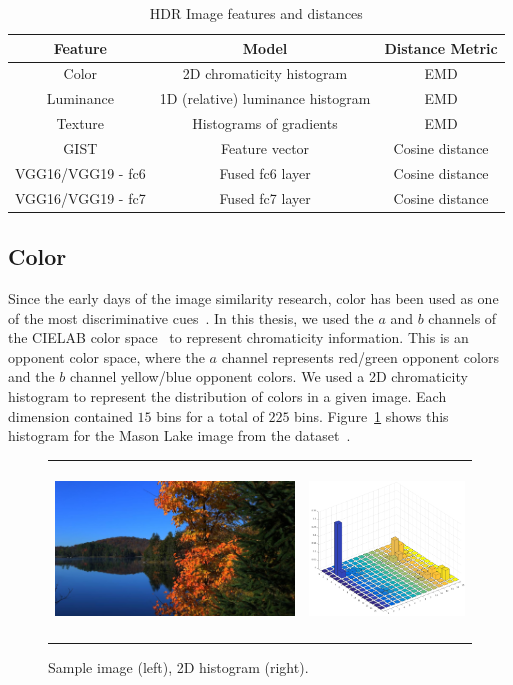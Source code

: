 \begin{table}
\caption{HDR Image features and distances}
\centering
\begin{tabular}{c|c|c}
\label{tab:table_feature}
\textbf{Feature} & \textbf{Model} & \textbf{Distance Metric}\\
\hline
Color  & 2D chromaticity histogram & EMD \\
Luminance  & 1D (relative) luminance histogram & EMD \\
Texture  & Histograms of gradients & EMD \\
GIST  & Feature vector & Cosine distance \\
VGG16/VGG19 - fc6 & Fused fc6 layer & Cosine distance  \\
VGG16/VGG19 - fc7 & Fused fc7 layer & Cosine distance
\end{tabular}
\end{table}

\subsection{Color}
Since the early days of the image similarity research, color has been used as one of the most discriminative cues~\cite{neumann2006image}. In this thesis,  we used the $a$ and $b$ channels of the CIELAB color space~\cite{iso201111664} to represent chromaticity information. This is an opponent color space, where the $a$ channel represents red/green opponent colors and the $b$ channel yellow/blue opponent colors. We used a 2D chromaticity histogram to represent the distribution of colors in a given image. Each dimension contained $15$ bins for a total of $225$ bins. Figure~\ref{fig:hists} shows this histogram for the Mason Lake image from the dataset~\cite{fairchild2007hdr}.

\begin{figure}
\centering
\begin{tabular}{c c}
\includegraphics[height=1.8in]{figures/chapter2/MasonLake.jpg} &
\includegraphics[height=1.8in]{figures/chapter2/57_histab.png}
\end{tabular}
\caption{Sample image (left), 2D histogram (right).}
\label{fig:hists}
\end{figure}

